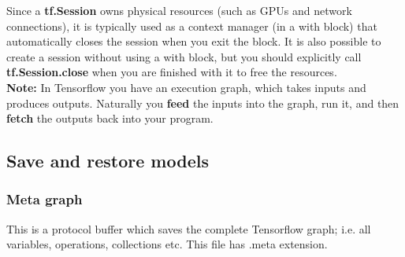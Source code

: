     Since a \textbf{tf.Session} owns physical resources (such as GPUs and network connections), it is typically used as a context manager (in a with block) that automatically closes the session when you exit the block. It is also possible to create a session without using a with block, but you should explicitly call \textbf{tf.Session.close} when you are finished with it to free the resources.\\
    \textbf{Note: }In Tensorflow you have an execution graph, which takes inputs and produces outputs. Naturally you \textbf{feed} the inputs into the graph, run it, and then \textbf{fetch} the outputs back into your program.
    \subsection{Save and restore models}
    \subsubsection{Meta graph}
    This is a protocol buffer which saves the complete Tensorflow graph; i.e. all variables, operations, collections etc. This file has .meta extension.
